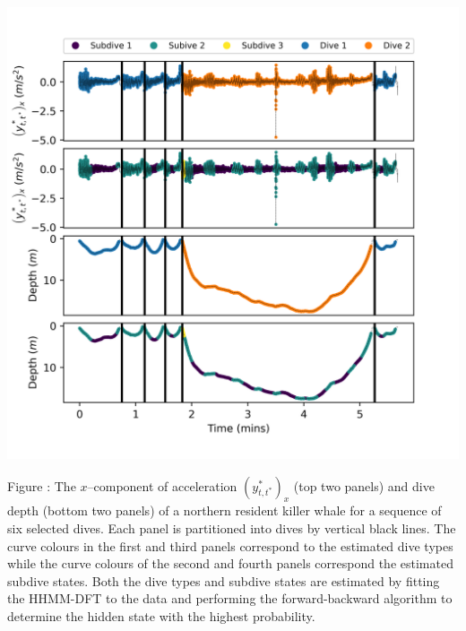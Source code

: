 \documentclass{article}
\begin{document}
        \begin{center}
        \includegraphics[width=6in]{../Plots/2019/20190902-182840-CATs_OB_1_0_267_HHMM_decoded_dives.png}
        \end{center}
        
        \noindent Figure : The $x$--component of acceleration $\left(y^*_{t,t^*}\right)_x$ (top two panels) and dive depth (bottom two panels) of a northern resident killer whale for a sequence of six selected dives. Each panel is partitioned into dives by vertical black lines. The curve colours in the first and third panels correspond to the estimated dive types while the curve colours of the second and fourth panels correspond the estimated subdive states. Both the dive types and subdive states are estimated by fitting the HHMM-DFT to the data and performing the forward-backward algorithm to determine the hidden state with the highest probability.
        \addtocounter{fignum}{1}
        
\end{document}
